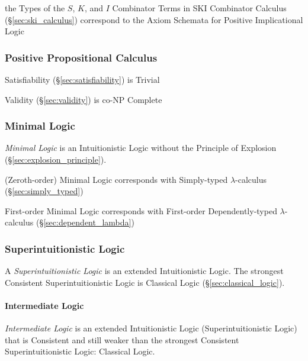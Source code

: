 the Types of the $S$, $K$, and $I$ Combinator Terms in SKI Combinator
Calculus (\S\ref{sec:ski_calculus}) correspond to the Axiom Schemata
for Positive Implicational Logic



\subsubsection{Positive Propositional Calculus}
\label{sec:positive_propositional}

Satisfiability (\S\ref{sec:satisfiability}) is Trivial

Validity (\S\ref{sec:validity}) is co-NP Complete %



\subsubsection{Minimal Logic}\label{sec:minimal_logic}

\emph{Minimal Logic} is an Intuitionistic Logic without the Principle
of Explosion (\S\ref{sec:explosion_principle}).

(Zeroth-order) Minimal Logic corresponds with Simply-typed
$\lambda$-calculus (\S\ref{sec:simply_typed})

First-order Minimal Logic corresponds with First-order Dependently-typed
$\lambda$-calculus (\S\ref{sec:dependent_lambda})



\subsubsection{Superintuitionistic Logic}
\label{sec:superintuitionistic_logic}

A \emph{Superintuitionistic Logic} is an extended Intuitionistic
Logic. The strongest Consistent Superintuitionistic Logic is Classical
Logic (\S\ref{sec:classical_logic}).



\paragraph{Intermediate Logic}\label{sec:intermediate_logic}\hfill

\emph{Intermediate Logic} is an extended Intuitionistic Logic
(Superintuitionistic Logic) that is Consistent and still weaker than
the strongest Consistent Superintuitionistic Logic: Classical Logic.



